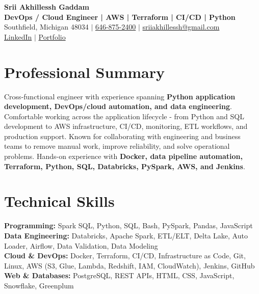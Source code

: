 \documentclass[letterpaper,10pt]{article}
\begin{document}
\fontsize{9.35pt}{10.45pt}\selectfont

\begin{center}
    {\LARGE \textbf{Srii Akhillessh Gaddam}} \\[-1pt]
    \textbf{DevOps / Cloud Engineer | AWS | Terraform | CI/CD | Python} \\[2pt]
    Southfield, Michigan 48034 $|$
    \href{tel:6468752400}{646-875-2400} $|$
    \href{mailto:sriiakhillessh@gmail.com}{sriiakhillessh@gmail.com} \\[1pt]
    \href{https://www.linkedin.com/in/srii-akhiilessh-gaddam-b48668191/}{LinkedIn} $|$
    \href{https://sriiakhillesshg.github.io/portfolio/}{Portfolio}
\end{center}
\vspace{-8pt}

\section{Professional Summary}
\small{Cross-functional engineer with experience spanning \textbf{Python application development, DevOps/cloud automation, and data engineering}. Comfortable working across the application lifecycle - from Python and SQL development to AWS infrastructure, CI/CD, monitoring, ETL workflows, and production support. Known for collaborating with engineering and business teams to remove manual work, improve reliability, and solve operational problems. Hands-on experience with \textbf{Docker, data pipeline automation, Terraform, Python, SQL, Databricks, PySpark, AWS, and Jenkins}.}

\section{Technical Skills}
\small{
\textbf{Programming:} Spark SQL, Python, SQL, Bash, PySpark, Pandas, JavaScript \\
\textbf{Data Engineering:} Databricks, Apache Spark, ETL/ELT, Delta Lake, Auto Loader, Airflow, Data Validation, Data Modeling \\
\textbf{Cloud \& DevOps:} Docker, Terraform, CI/CD, Infrastructure as Code, Git, Linux, AWS (S3, Glue, Lambda, Redshift, IAM, CloudWatch), Jenkins, GitHub \\
\textbf{Web \& Databases:} PostgreSQL, REST APIs, HTML, CSS, JavaScript, Snowflake, Greenplum
}
\end{document}
